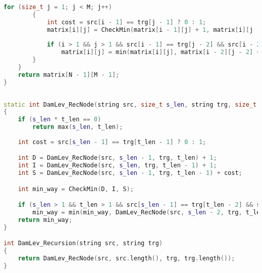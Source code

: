 \par   \text{~~~~~~}
\par   \text{~~~~~~}
\par   \text{~~~~~~}
	\begin{lstlisting}[language=C++, label=lst:matr:DamLevenstein2, caption=Функция поиска расстояния Дамерау-Левенштейна с использованием матрицы]
        for (size_t j = 1; j < M; j++)
        {
            int cost = src[i - 1] == trg[j - 1] ? 0 : 1;
            matrix[i][j] = CheckMin(matrix[i - 1][j] + 1, matrix[i][j - 1] + 1, matrix[i - 1][j - 1] + cost);
            
            if (i > 1 && j > 1 && src[i - 1] == trg[j - 2] && src[i - 2] == trg[j - 1])
                matrix[i][j] = min(matrix[i][j], matrix[i - 2][j - 2] + cost);
        }
    }
    return matrix[N - 1][M - 1];
}
        \end{lstlisting}

        \begin{lstlisting}[language=C++, label=lst:rec:DamLevenstein, caption=Функция рекурсивного поиска расстояния Дамерау-Левенштейна]
        	
static int DamLev_RecNode(string src, size_t s_len, string trg, size_t t_len)
{
    if (s_len * t_len == 0)
        return max(s_len, t_len);
    
    int cost = src[s_len - 1] == trg[t_len - 1] ? 0 : 1;

    int D = DamLev_RecNode(src, s_len - 1, trg, t_len) + 1;
    int I = DamLev_RecNode(src, s_len, trg, t_len - 1) + 1;
    int S = DamLev_RecNode(src, s_len - 1, trg, t_len - 1) + cost;

    int min_way = CheckMin(D, I, S);

    if (s_len > 1 && t_len > 1 && src[s_len - 1] == trg[t_len - 2] && src[s_len - 2] == trg[t_len - 1])
        min_way = min(min_way, DamLev_RecNode(src, s_len - 2, trg, t_len - 2) + 1);
    return min_way;
}

int DamLev_Recursion(string src, string trg)
{
    return DamLev_RecNode(src, src.length(), trg, trg.length());
}
        \end{lstlisting}
	
\par   \text{~~~~~~}

